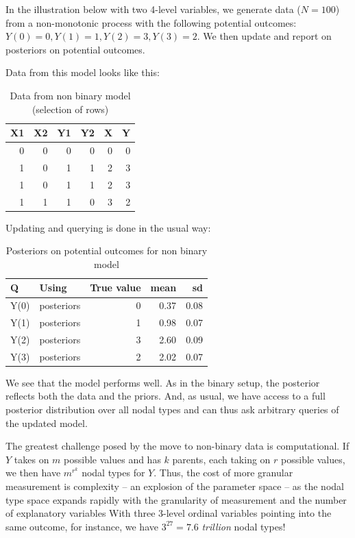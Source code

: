 \documentclass[
  12pt,
]{book}
\begin{document}
In the illustration below with two 4-level variables, we generate data (\(N=100\)) from a non-monotonic process with the following potential outcomes: \(Y(0)=0, Y(1)=1, Y(2)=3, Y(3) = 2\). We then update and report on posteriors on potential outcomes.

Data from this model looks like this:

\begin{table}

\caption{\label{tab:unnamed-chunk-14}Data from non binary model (selection of rows)}
\centering
\begin{tabular}[t]{r|r|r|r|r|r}
\hline
X1 & X2 & Y1 & Y2 & X & Y\\
\hline
0 & 0 & 0 & 0 & 0 & 0\\
\hline
1 & 0 & 1 & 1 & 2 & 3\\
\hline
1 & 0 & 1 & 1 & 2 & 3\\
\hline
1 & 1 & 1 & 0 & 3 & 2\\
\hline
\end{tabular}
\end{table}

Updating and querying is done in the usual way:

\begin{table}

\caption{\label{tab:unnamed-chunk-16}Posteriors on potential outcomes for non binary model}
\centering
\begin{tabular}[t]{l|l|r|r|r}
\hline
Q & Using & True value & mean & sd\\
\hline
Y(0) & posteriors & 0 & 0.37 & 0.08\\
\hline
Y(1) & posteriors & 1 & 0.98 & 0.07\\
\hline
Y(2) & posteriors & 3 & 2.60 & 0.09\\
\hline
Y(3) & posteriors & 2 & 2.02 & 0.07\\
\hline
\end{tabular}
\end{table}

We see that the model performs well. As in the binary setup, the posterior reflects both the data and the priors. And, as usual, we have access to a full posterior distribution over all nodal types and can thus ask arbitrary queries of the updated model.

The greatest challenge posed by the move to non-binary data is computational. If \(Y\) takes on \(m\) possible values and has \(k\) parents, each taking on \(r\) possible values, we then have \(m^{r^k}\) nodal types for \(Y\). Thus, the cost of more granular measurement is complexity -- an explosion of the parameter space -- as the nodal type space expands rapidly with the granularity of measurement and the number of explanatory variables With three 3-level ordinal variables pointing into the same outcome, for instance, we have \(3^{27} = 7.6\) \emph{trillion} nodal types!
\end{document}
